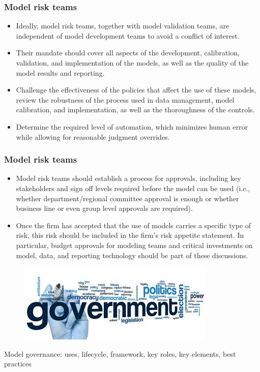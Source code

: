 \documentclass[11pt]{beamer}
\begin{document}
\begin{frame}
\frametitle{Model risk teams}
\begin{itemize}
\item Ideally, model risk teams, together with model validation teams, are independent of model development teams to avoid a conflict of interest.
\item Their mandate should cover all aspects of the development, calibration, validation, and implementation of the models, as well as the quality of the model results and reporting.
\item Challenge the effectiveness of the policies that affect the use of these models, review the robustness of the process used in data management, model calibration, and implementation, as well as the thoroughness of the controls.
\item Determine the required level of automation, which minimizes human error while allowing for reasonable judgment overrides.
\end{itemize}
\end{frame}


\begin{frame}
\frametitle{Model risk teams}
\begin{itemize}
\item Model risk teams should establish a process for approvals, including key stakeholders and sign ­off levels required before the model can be used (i.e., whether department/regional committee approval is enough or whether business line or even group level approvals are required).
\item Once the firm has accepted that the use of models carries a specific type of risk, this risk should be included in the firm’s risk appetite statement. In particular, budget approvals for modeling teams and critical investments on model, data, and reporting technology should be part of these discussions.
\end{itemize}
\end{frame}


\begin{frame}
\begin{figure}[h]
	\centering
	\includegraphics[scale=.3]{images/governance}
\end{figure}
\centering
Model governance: uses, lifecycle, framework, key roles, key elements, best practices
\end{frame}
\end{document}
